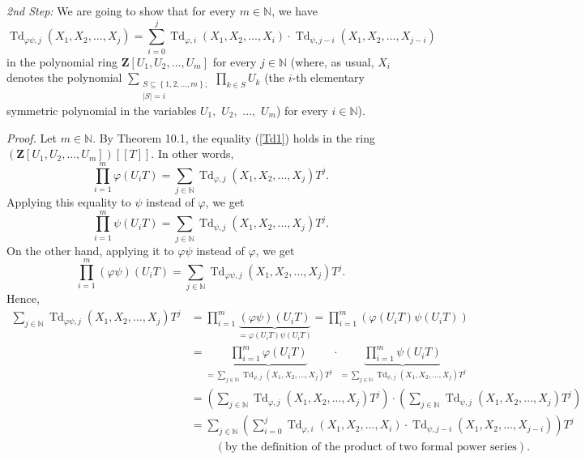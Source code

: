 \documentclass[numbers=enddot,12pt,final,onecolumn,notitlepage]{scrartcl}%
\begin{document}
\textit{2nd Step:} We are going to show that for every $m\in\mathbb{N}$, we
have%
\[
\operatorname*{Td}\nolimits_{\varphi\psi,j}\left(  X_{1},X_{2},...,X_{j}%
\right)  =\sum_{i=0}^{j}\operatorname*{Td}\nolimits_{\varphi,i}\left(
X_{1},X_{2},...,X_{i}\right)  \cdot\operatorname*{Td}\nolimits_{\psi
,j-i}\left(  X_{1},X_{2},...,X_{j-i}\right)
\]
in the polynomial ring $\mathbf{Z}\left[  U_{1},U_{2},...,U_{m}\right]  $ for
every $j\in\mathbb{N}$ (where, as usual, $X_{i}$ denotes the polynomial
$\sum\limits_{\substack{S\subseteq\left\{  1,2,...,m\right\}  ;\\\left\vert
S\right\vert =i}}\prod\limits_{k\in S}U_{k}$ (the $i$-th elementary symmetric
polynomial in the variables $U_{1},$ $U_{2},$ $...,$ $U_{m}$) for every
$i\in\mathbb{N}$).

\textit{Proof.} Let $m\in\mathbb{N}$. By Theorem 10.1, the equality
(\ref{Td1}) holds in the ring $\left(  \mathbf{Z}\left[  U_{1},U_{2}%
,...,U_{m}\right]  \right)  \left[  \left[  T\right]  \right]  $. In other
words,%
\[
\prod\limits_{i=1}^{m}\varphi\left(  U_{i}T\right)  =\sum\limits_{j\in
\mathbb{N}}\operatorname*{Td}\nolimits_{\varphi,j}\left(  X_{1},X_{2}%
,...,X_{j}\right)  T^{j}.
\]
Applying this equality to $\psi$ instead of $\varphi$, we get%
\[
\prod\limits_{i=1}^{m}\psi\left(  U_{i}T\right)  =\sum\limits_{j\in\mathbb{N}%
}\operatorname*{Td}\nolimits_{\psi,j}\left(  X_{1},X_{2},...,X_{j}\right)
T^{j}.
\]
On the other hand, applying it to $\varphi\psi$ instead of $\varphi$, we get%
\[
\prod\limits_{i=1}^{m}\left(  \varphi\psi\right)  \left(  U_{i}T\right)
=\sum\limits_{j\in\mathbb{N}}\operatorname*{Td}\nolimits_{\varphi\psi
,j}\left(  X_{1},X_{2},...,X_{j}\right)  T^{j}.
\]
Hence,%
\begin{align*}
\sum\limits_{j\in\mathbb{N}}\operatorname*{Td}\nolimits_{\varphi\psi,j}\left(
X_{1},X_{2},...,X_{j}\right)  T^{j}  &  =\prod\limits_{i=1}^{m}%
\underbrace{\left(  \varphi\psi\right)  \left(  U_{i}T\right)  }%
_{=\varphi\left(  U_{i}T\right)  \psi\left(  U_{i}T\right)  }=\prod
\limits_{i=1}^{m}\left(  \varphi\left(  U_{i}T\right)  \psi\left(
U_{i}T\right)  \right) \\
&  =\underbrace{\prod\limits_{i=1}^{m}\varphi\left(  U_{i}T\right)  }%
_{=\sum\limits_{j\in\mathbb{N}}\operatorname*{Td}\nolimits_{\varphi,j}\left(
X_{1},X_{2},...,X_{j}\right)  T^{j}}\cdot\underbrace{\prod\limits_{i=1}%
^{m}\psi\left(  U_{i}T\right)  }_{=\sum\limits_{j\in\mathbb{N}}%
\operatorname*{Td}\nolimits_{\psi,j}\left(  X_{1},X_{2},...,X_{j}\right)
T^{j}}\\
&  =\left(  \sum\limits_{j\in\mathbb{N}}\operatorname*{Td}\nolimits_{\varphi
,j}\left(  X_{1},X_{2},...,X_{j}\right)  T^{j}\right)  \cdot\left(
\sum\limits_{j\in\mathbb{N}}\operatorname*{Td}\nolimits_{\psi,j}\left(
X_{1},X_{2},...,X_{j}\right)  T^{j}\right) \\
&  =\sum\limits_{j\in\mathbb{N}}\left(  \sum_{i=0}^{j}\operatorname*{Td}%
\nolimits_{\varphi,i}\left(  X_{1},X_{2},...,X_{i}\right)  \cdot
\operatorname*{Td}\nolimits_{\psi,j-i}\left(  X_{1},X_{2},...,X_{j-i}\right)
\right)  T^{j}\\
&  \ \ \ \ \ \ \ \ \ \ \left(  \text{by the definition of the product of two
formal power series}\right)  .
\end{align*}
\end{document}
